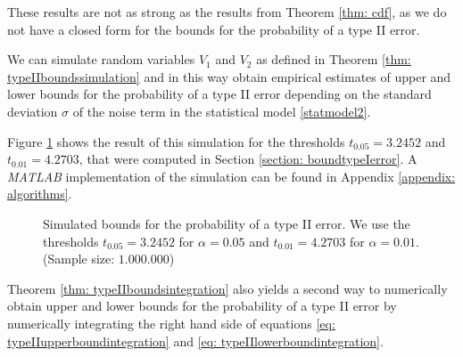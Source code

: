 \documentclass[a4paper,12pt]{article}
\theoremstyle{plain}
\theoremstyle{definition}
\begin{document}
These results are not as strong as the results from Theorem \ref{thm: cdf}, as we do not have a closed form for the bounds for the probability of a type II error.

We can simulate random variables $V_1$ and $V_2$ as defined in Theorem \ref{thm: typeIIboundssimulation} and in this way obtain empirical estimates of upper and lower bounds for the probability of a type II error depending on the standard deviation $\sigma$ of the noise term in the statistical model \eqref{statmodel2}.

Figure \ref{fig: simulatedboundstypeIIerror} shows the result of this simulation for the thresholds $t_{0.05} = 3.2452$ and $t_{0.01} = 4.2703$, that were computed in Section \ref{section: boundtypeIerror}. A \emph{MATLAB} implementation of the simulation can be found in Appendix \ref{appendix: algorithms}.

\begin{figure}[h!]
	\centering
	\caption{Simulated bounds for the probability of a type II error. We use the thresholds $t_{0.05} = 3.2452$ for $\alpha = 0.05$ and $t_{0.01} = 4.2703$ for $\alpha = 0.01$. (Sample size: $1.000.000$)}
	\label{fig: simulatedboundstypeIIerror}
\end{figure}

Theorem \ref{thm: typeIIboundsintegration} also yields a second way to numerically obtain upper and lower bounds for the probability of a type II error by numerically integrating the right hand side of equations \eqref{eq: typeIIupperboundintegration} and \eqref{eq: typeIIlowerboundintegration}.
\end{document}
